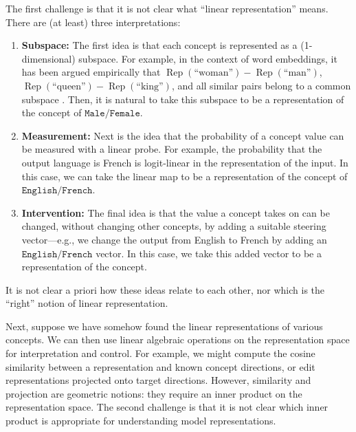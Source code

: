 \documentclass{article}
\theoremstyle{plain}
\theoremstyle{definition}
\theoremstyle{remark}
\DeclareMathOperator{\repOp}{Rep}
\newcommand{\repText}[1]{\repOp(\text{``#1''})}
\newcommand{\ConceptName}[1]{$\mathtt{#1}$}
\begin{document}
The first challenge is that it is not clear what ``linear representation'' means. 
There are (at least) three interpretations:
\begin{enumerate}[topsep=0pt, parsep=0pt, partopsep=0pt]
    \item \textbf{Subspace:}  The first idea is that each concept is represented as a (1-dimensional) subspace.
    For example, in the context of word embeddings, it has been argued empirically that $\repText{woman}-\repText{man}$, $\repText{queen}-\repText{king}$, and all similar pairs belong to a common subspace \citep{mikolov2013linguistic}. Then, it is natural to take this subspace to be a representation of the concept of \ConceptName{Male/Female}.
    \item \textbf{Measurement:}  Next is the idea that the probability of a concept value can be measured with a linear probe.
    For example, the probability that the output language is French is logit-linear in the representation of the input.
    In this case, we can take the linear map to be a representation of the concept of \ConceptName{English/French}.
    \item \textbf{Intervention:}   The final idea is that the value a concept takes on can be changed, without changing other concepts, by adding a suitable steering vector---e.g., we change the output from English to French by adding an \ConceptName{English/French} vector. In this case, we take this added vector to be a representation of the concept.
\end{enumerate}
It is not clear a priori how these ideas relate to each other, nor which is the ``right'' notion of linear representation.


Next, suppose we have somehow found the linear representations of various concepts. We can then use linear algebraic operations on the representation space for interpretation and control. For example, we might compute the cosine similarity between a representation and known concept directions, or edit representations projected onto target directions.
However, similarity and projection are geometric notions: they require an inner product on the representation space. The second challenge is that it is not clear which inner product is appropriate for understanding model representations.
\end{document}
